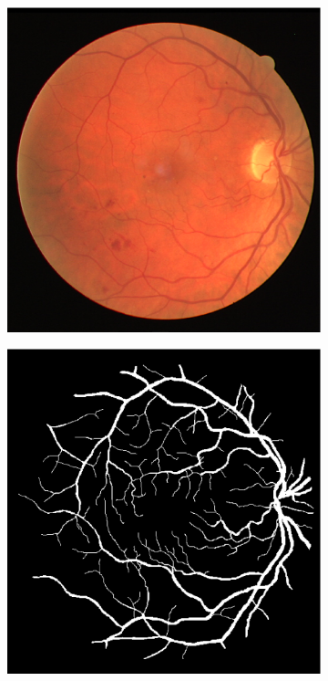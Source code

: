 \documentclass[aps,prb,10pt,twocolumn,groupedaddress]{revtex4-1}
\begin{document}
\begin{figure}[!t]
	\centering
	\begin{subfigure}[]{0.22\textwidth}
		\centering
		\includegraphics[width=\textwidth]{images/14_test.eps}
		\caption{}
	\end{subfigure}
	\hspace{0.25cm}
	\centering
	\begin{subfigure}[]{0.22\textwidth}
		\centering
		\includegraphics[width=\textwidth]{images/14_manual1.eps}

\end{subfigure}
\end{figure}
\end{document}
